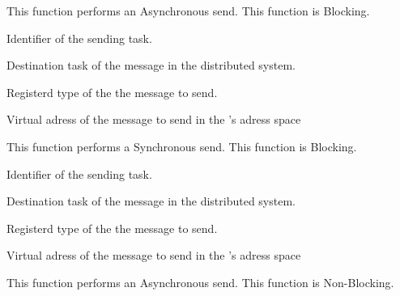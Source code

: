 \begin{itemize}
	 {
	   This function performs an Asynchronous send.
	   This function is Blocking.

	   \item {}

	     Identifier of the sending task.

	   \item {}

	     Destination task of the message in the distributed system.

	   \item {}

	     Registerd type of the the message to send.

	   \item {}

	     Virtual adress of the message to send in the
	     's adress space
	 }

	 {
	   This function performs a Synchronous send.
	   This function is Blocking.

	   \item {}

	     Identifier of the sending task.

	   \item {}

	     Destination task of the message in the distributed system.

	   \item {}

	     Registerd type of the the message to send.

	   \item {}

	     Virtual adress of the message to send in the
	     's adress space
	 }

	 {
	   This function performs an Asynchronous send.
	   This function is Non-Blocking.

}
\end{itemize}
